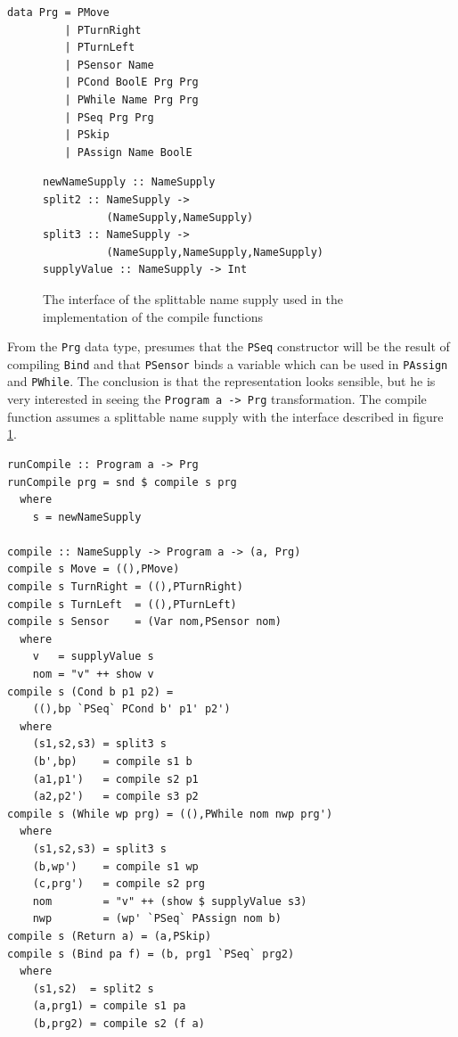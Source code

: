 \begin{small} 
\begin{verbatim}
data Prg = PMove          
         | PTurnRight
         | PTurnLeft
         | PSensor Name  
         | PCond BoolE Prg Prg
         | PWhile Name Prg Prg 
         | PSeq Prg Prg
         | PSkip       
         | PAssign Name BoolE
\end{verbatim}
\end{small}

\begin{figure} 
\begin{small}
\begin{verbatim} 
newNameSupply :: NameSupply 
split2 :: NameSupply -> 
          (NameSupply,NameSupply) 
split3 :: NameSupply -> 
          (NameSupply,NameSupply,NameSupply)
supplyValue :: NameSupply -> Int 
\end{verbatim} 
\end{small}
\caption{The interface of the splittable name supply used in the implementation 
of the compile functions} 
\label{fig:namesupply}
\end{figure}

From the {\tt Prg} data type, \docname{} presumes that the {\tt PSeq}
constructor will be the result of compiling {\tt Bind} and that
{\tt PSensor} binds a variable which can be used in {\tt PAssign} and
{\tt PWhile}. The conclusion is that the representation looks
sensible, but he is very interested in seeing the {\tt Program a -> Prg}
transformation. The compile function assumes a splittable name
supply with the interface described in figure \ref{fig:namesupply}.

\begin{small} 
\begin{verbatim}
runCompile :: Program a -> Prg
runCompile prg = snd $ compile s prg 
  where 
    s = newNameSupply
    
compile :: NameSupply -> Program a -> (a, Prg) 
compile s Move = ((),PMove)
compile s TurnRight = ((),PTurnRight)
compile s TurnLeft  = ((),PTurnLeft)
compile s Sensor    = (Var nom,PSensor nom)
  where
    v   = supplyValue s
    nom = "v" ++ show v 
compile s (Cond b p1 p2) = 
    ((),bp `PSeq` PCond b' p1' p2') 
  where
    (s1,s2,s3) = split3 s
    (b',bp)    = compile s1 b
    (a1,p1')   = compile s2 p1
    (a2,p2')   = compile s3 p2
compile s (While wp prg) = ((),PWhile nom nwp prg') 
  where
    (s1,s2,s3) = split3 s
    (b,wp')    = compile s1 wp
    (c,prg')   = compile s2 prg 
    nom        = "v" ++ (show $ supplyValue s3)
    nwp        = (wp' `PSeq` PAssign nom b) 
compile s (Return a) = (a,PSkip)
compile s (Bind pa f) = (b, prg1 `PSeq` prg2) 
  where
    (s1,s2)  = split2 s
    (a,prg1) = compile s1 pa
    (b,prg2) = compile s2 (f a) 
\end{verbatim}
\end{small}

